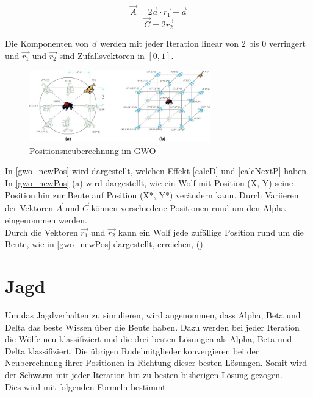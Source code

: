 \begin{equation}
    \vec{A} = 2 \vec{a} \cdot \vec{r_1} - \vec{a}
    \label{calcA}
\end{equation}
\begin{equation}
    \vec{C} = 2 \vec{r_2}
    \label{calcC}
\end{equation}

Die Komponenten von $\vec{a}$ werden mit jeder Iteration linear von $2$ bis $0$ verringert und $\vec{r_1}$ und $\vec{r_2}$ sind Zufallsvektoren in $[0,1]$.\\
\begin{figure}[ht]
    \begin{center}
        \includegraphics[width=0.7\textwidth]{assets/img/Updating_position_of_gray_wolves_in_GWO.jpg}
        \caption[Positionsneuberechnung im GWO]{Positionsneuberechnung im GWO \cite{MIRJALILI201446}}
        \label{gwo_newPos}
    \end{center}
\end{figure}

In \autoref{gwo_newPos} wird dargestellt, welchen Effekt \autoref{calcD} und \autoref{calcNextP} haben. In \autoref{gwo_newPos} (a) wird dargestellt, wie ein Wolf mit Position (X, Y) seine Position hin zur Beute auf Position (X*, Y*) verändern kann. Durch Variieren der Vektoren $\vec{A}$ und $\vec{C}$ können verschiedene Positionen rund um den Alpha eingenommen werden. \\
Durch die Vektoren $\vec{r_1}$ und $\vec{r_2}$ kann ein Wolf jede zufällige Position rund um die Beute, wie in \autoref{gwo_newPos} dargestellt, erreichen, (\cite[vgl. Mirjalili 2014, S.6]{MIRJALILI201446}).

\section{Jagd}
Um das Jagdverhalten zu simulieren, wird angenommen, dass Alpha, Beta und Delta das beste Wissen über die Beute haben. Dazu werden bei jeder Iteration die Wölfe neu klassifiziert und die drei besten Lösungen als Alpha, Beta und Delta klassifiziert. Die übrigen Rudelmitglieder konvergieren bei der Neuberechnung ihrer Positionen in Richtung dieser besten Lösungen. Somit wird der Schwarm mit jeder Iteration hin zu besten bisherigen Lösung gezogen. \\
Dies wird mit folgenden Formeln bestimmt:

